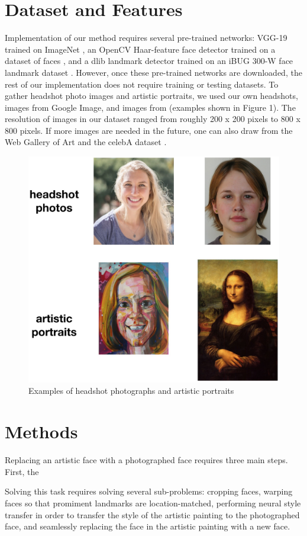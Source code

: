 \documentclass{article}
\begin{document}
\section{Dataset and Features}

Implementation of our method requires several pre-trained networks: VGG-19 trained on ImageNet \cite{Simonyan14c}, an OpenCV Haar-feature face detector trained on a dataset of faces \cite{opencv_library}, and a dlib landmark detector trained on an iBUG 300-W face landmark dataset \cite{dlib09}. However, once these pre-trained networks are downloaded, the rest of our implementation does not require training or testing datasets. To gather headshot photo images and artistic portraits, we used our own headshots, images from Google Image, and images from \cite{selim2016painting} (examples shown in Figure 1). The resolution of images in our dataset ranged from roughly 200 x 200 pixels to 800 x 800 pixels. If more images are needed in the future, one can also draw from the Web Gallery of Art \cite{WebGallery} and the celebA dataset \cite{liu2018large}.

\begin{figure}[ht]
  \begin{center}
    \includegraphics[width=.45\textwidth]{example_images.jpg}
    \caption{Examples of headshot photographs and artistic portraits} \label{fig:examples}
  \end{center}
\end{figure} 

\section{ Methods }

Replacing an artistic face with a photographed face requires three main steps. First, the 

Solving this task requires solving several sub-problems: cropping faces, warping faces so that promiment landmarks are location-matched, performing neural style transfer in order to transfer the style of the artistic painting to the photographed face, and seamlessly replacing the face in the artistic painting with a new face. 
\end{document}
